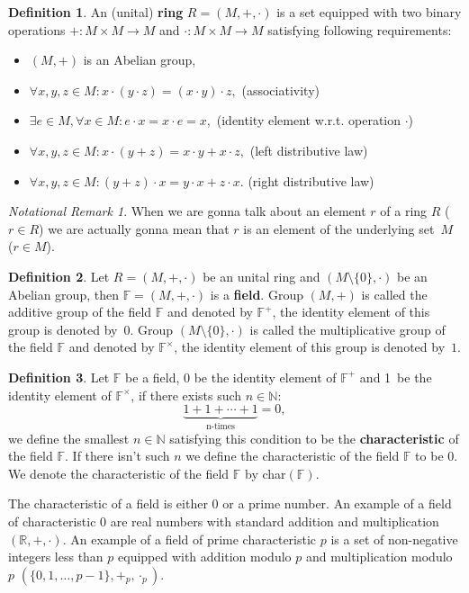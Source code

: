 \documentclass[thesis=M,english]{FITthesis}[2012/10/20]
\theoremstyle{remark}
\newtheorem*{NRM}{Notational Remark}
\theoremstyle{definition}
\newtheorem{DF}{Definition}[section]
\begin{document}
\begin{DF}
An (unital) \textbf{ring} $R = (M, +, \cdot)$  is a set equipped with two binary operations $+: M\times M \to M$ and $\cdot:  M\times M \to M$ satisfying following requirements:
\begin{itemize}
\item $(M, +)$ is an Abelian group, 
\item $\forall x,y,z \in M: x\cdot(y\cdot z) = (x \cdot y) \cdot z, $ \hfill (associativity)
\item $\exists e \in M,\forall x \in M: e \cdot x = x \cdot e = x,$ \hfill (identity element w.r.t. operation $\cdot$)
\item $\forall x,y,z \in M:x \cdot(y+z)= x\cdot y + x \cdot z,$ \hfill (left distributive law) 
\item $\forall x,y, z \in M:(y + z) \cdot x = y\cdot x + z \cdot x.$ \hfill(right distributive law)
\end{itemize}
\end{DF}
\begin{NRM}
When we are gonna talk about an element $r$ of a ring $R$ ($r \in R$) we are actually gonna mean that $r$ is an element of the underlying set~$M$ ($r \in M$).
\end{NRM}
\begin{DF}
Let $R = (M,+,\cdot)$ be an unital ring and $(M \setminus \{0\}, \cdot)$ be an Abelian group, then $\mathbb{F} = (M, +, \cdot)$ is a \textbf{field}. Group $(M, +)$ is  called the additive group of the field $\mathbb{F}$ and denoted by $\mathbb{F}^+$, the identity element of this group is denoted by~$0$. Group $(M \setminus \{0\}, \cdot)$ is called the multiplicative group of the field $\mathbb{F}$ and denoted by $\mathbb{F}^\times$, the identity element of this group is denoted by~$1$.
\end{DF}
\begin{DF}
Let $\mathbb{F}$ be a field, 0 be the identity element of $\mathbb{F}^+$ and 1~be the identity element of $\mathbb{F}^\times$, if there exists such $n \in \mathbb{N}:$
$$
 \underbrace{1 + 1 + \cdots + 1}_\text{n-times} = 0,
$$ we define the smallest $n \in \mathbb{N}$ satisfying this condition to be the \textbf{characteristic} of the field $\mathbb{F}.$ If there isn't such $n$ we define the characteristic of the field $\mathbb{F}$ to be $0$. We denote the characteristic of the field $\mathbb{F}$ by char$(\mathbb{F})$.
\end{DF}
\noindent The characteristic of a field is either $0$ or a prime number. An example of a field of characteristic $0$ are real numbers with standard addition and multiplication $(\mathbb{R}, +, \cdot)$. An example of a field of prime characteristic $p$ is a set of non-negative integers less than $p$ equipped with addition modulo $p$ and multiplication modulo~$p$ $(\{0, 1, \ldots, p-1\}, +_p, \cdot_p)$. 
\end{document}
